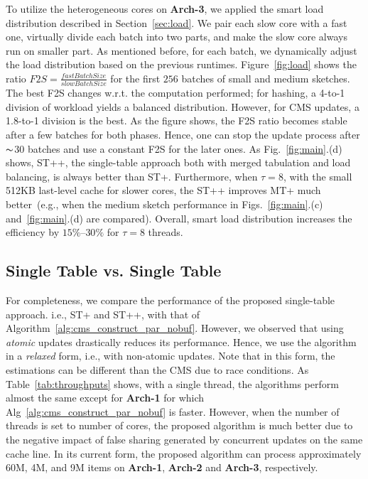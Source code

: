 \documentclass[runningheads]{llncs}
\begin{document}
To utilize the heterogeneous cores on {\bf Arch-3}, we applied the smart load distribution described in Section~\ref{sec:load}. We pair each slow core with a fast one, virtually divide each batch into two parts, and make the slow core always run on smaller part. 
As mentioned before, for each batch, we dynamically adjust the load distribution based on the previous runtimes. Figure~\ref{fig:load} shows the ratio $F2S = \frac{fastBatchSize}{slowBatchSize}$ for the first $256$ batches of small and medium sketches. The best F2S changes w.r.t. the computation performed; for hashing, a 4-to-1 division of workload yields a balanced distribution. However, for CMS updates, a 1.8-to-1 division is the best. As the figure shows, the F2S ratio becomes stable after a few batches for both phases. Hence, one can stop the update process after $\thicksim$$30$  batches and use a constant F2S for the later ones. As Fig.~\ref{fig:main}.(d) shows, ST++, the single-table approach both with merged tabulation and load balancing, is always better than ST+. Furthermore, when $\tau = 8$, with the small 512KB last-level cache for slower cores, the ST++ improves MT+ much better~(e.g., when the medium sketch performance in Figs.~\ref{fig:main}.(c) and~\ref{fig:main}.(d) are compared).  Overall, smart load distribution increases the efficiency by $15\%$--$30\%$ for $\tau = 8$ threads.  

\subsection{Single Table vs. Single Table}

For completeness, we compare the performance of the proposed single-table approach. i.e., ST+ and ST++, with that of Algorithm~\ref{alg:cms_construct_par_nobuf}. However, we observed that using {\em atomic} updates drastically reduces its performance. Hence, we use the algorithm in a {\em relaxed} form, i.e., with non-atomic updates. Note that in this form, the estimations can be different than the CMS due to race conditions. As Table~\ref{tab:throughputs} shows, with a single thread, the algorithms perform almost the same except for {\bf Arch-1} for which Alg~\ref{alg:cms_construct_par_nobuf} is faster. However, when the number of threads is set to number of cores, the proposed algorithm is much better due to the negative impact of false sharing generated by concurrent updates on the same cache line. In its current form, the proposed algorithm can process approximately 60M, 4M, and 9M items on  {\bf Arch-1},  {\bf Arch-2} and  {\bf Arch-3}, respectively.      
\vspace{-2ex}
\end{document}
